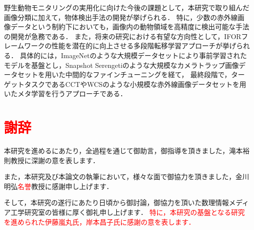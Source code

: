 \documentclass[a4paper,11pt,nomag]{jsreport}
\begin{document}
野生動物モニタリングの実用化に向けた今後の課題として，本研究で取り組んだ画像分類に加えて，物体検出手法の開発が挙げられる．
特に，少数の赤外線画像データという制約下においても，画像内の動物領域を高精度に検出可能な手法の開発が急務である．
また，将来の研究における有望な方向性として，IFORフレームワークの性能を潜在的に向上させる多段階転移学習アプローチが挙げられる．
具体的には，ImageNetのような大規模データセットにより事前学習されたモデルを基盤とし，Snapshot Serengetiのような大規模なカメラトラップ画像データセットを用いた中間的なファインチューニングを経て，
最終段階で，ターゲットタスクであるCCTやWCSのような小規模な赤外線画像データセットを用いたメタ学習を行うアプローチである．

\chapter*{\textcolor{red}{謝辞}}

本研究を進めるにあたり，全過程を通じて御助言，御指導を頂きました，滝本裕則教授に深謝の意を表します．

また，本研究及び本論文の執筆において，様々な面で御協力を頂きました，金川明弘\textcolor{red}{名誉}教授に感謝申し上げます．

そして，本研究の遂行にあたり日頃から御討論，御協力を頂いた数理情報メディア工学研究室の皆様に厚く御礼申し上げます．
\textcolor{red}{特に，本研究の基盤となる研究を進められた伊藤嵐丸氏，岸本昌子氏に感謝の意を表します．}



\end{document}
